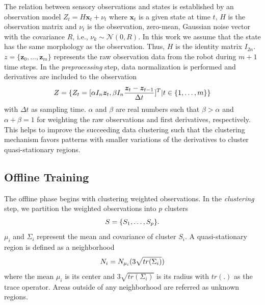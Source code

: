 \documentclass[runningheads]{llncs}
\begin{document}
The relation between sensory observations and states is established by an observation model $Z_t = H\bm{x}_t + \nu_t$ where $\bm{x}_t$ is a given state at time $t$, $H$ is the observation matrix and $\nu_t$ is the observation, zero-mean, Gaussian noise vector with the covariance $R$, i.e., $\nu_k \sim \mathcal{N}(0,R)$.  
In this work we assume that the state has the same morphology as the observation. Thus, $H$ is the identity matrix $I_{2n}$. $z = \{\bm{z}_0,\dots,\bm{z}_m\}$ represents the raw observation data from the robot during $m+1$ time steps. In the \textit{preprocessing} step, data normalization is performed and derivatives are included to the observation
\begin{equation}
    \small
     Z = \{Z_t=[\alpha I_n \bm{z}_t,\beta I_n \frac{\bm{z}_t-\bm{z}_{t-1}}{\Delta t}]^T | t \in \{1,\ldots,m\}\}
\end{equation}
with $\Delta t$ as sampling time.
$\alpha$ and $\beta$ are real numbers such that $\beta>\alpha$ and $\alpha+\beta=1$ for weighting the raw observations and first derivatives, respectively. This helps to improve the succeeding data clustering such that the clustering mechanism favors patterns with smaller variations of the derivatives to cluster quasi-stationary regions.

\subsection{Offline Training}
\label{sec-single-robot-offline-training}
The offline phase begins with clustering weighted observations. In the \textit{clustering} step, we partition the weighted observations into $p$ clusters 
    \begin{equation}
        \small
        S=\{S_1,\dots,S_{p}\}.
        \label{eq-abstract-states}
    \end{equation}
$\mu_i$ and $\Sigma_i$ represent the mean and covariance of cluster $S_i$. A quasi-stationary region is defined as a neighborhood  
    \begin{equation}
        \small
        N_i = N_{\mu_i}(3\sqrt{tr(\Sigma_i)})
    \end{equation}
where the mean $\mu_i$ is its center and $3\sqrt{tr(\Sigma_i)}$ is its radius with $tr(.)$ as the trace operator. Areas outside of any neighborhood are referred as unknown regions.
\end{document}
